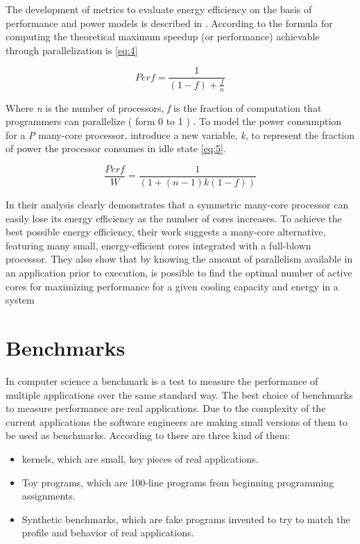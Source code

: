 The development of metrics to evaluate energy efficiency on the basis of
performance and power models is described in \cite{Dong}. According to
\cite{Dong} the formula for computing the theoretical maximum speedup (or
performance) achievable through parallelization is \ref{eq:4}

\begin{equation}\label{eq:4}
Perf = \frac{1}{(1 - f) + \frac{f}{n}}
\end{equation}

Where \textit{n} is the number of processors,  \textit{f} is the fraction of
computation that programmers can parallelize  ( form 0 to 1 ) . To model the
power consumption for a \textit{P} many-core processor, \cite{Dong} introduce a
new variable, \textit{k}, to represent the fraction of power the processor
consumes in idle state \ref{eq:5}. 

\begin{equation}\label{eq:5}
\frac{Perf}{W} = \frac{1}{(1 + (n -1 ) k (1 - f))}
\end{equation}

In \cite{Dong} their analysis clearly demonstrates that a symmetric many-core
processor can easily  lose its energy efficiency as the number of cores
increases. To achieve the  best possible energy efficiency, their  work
suggests a many-core alternative, featuring many small, energy-efficient cores
integrated with a full-blown processor. They also show that by knowing the
amount of parallelism available in an application prior to execution, is
possible to  find the optimal number of active cores for maximizing performance
for a given cooling capacity and energy in a system

\section{Benchmarks}

In computer science a benchmark is a test to measure the performance of
multiple applications over the same standard way. The best choice of benchmarks
to measure performance are real applications. Due to the complexity of the
current applications the software engineers are making small versions of them
to be used as benchmarks. According to \cite{Hennessy} there are three kind of
them: 

\begin{itemize}
\item kernels, which are small, key pieces of real applications.
\item Toy programs, which are 100-line programs from beginning programming
assignments.
\item Synthetic benchmarks, which are fake programs invented to try to match the
profile and behavior of real applications.
\end{itemize}

